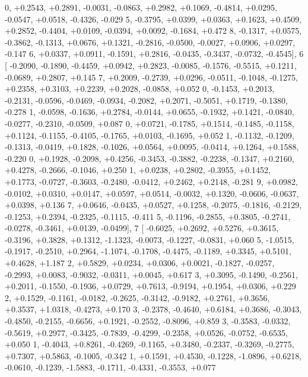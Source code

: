 \begin{DoxyCode}
      0, +0.2543, +0.2891, -0.0031, -0.0863, +0.2982, +0.1069, -0.4814, +0.0295, -0.0547, +0.0518, -0.4326, -0.029
      5, -0.3795, +0.0399, +0.0363, +0.1623, +0.4509, +0.2852, -0.4404, +0.0109, -0.0394, +0.0092, -0.1684, +0.472
      8, -0.1317, +0.0575, -0.3862, -0.1313, +0.0676, +0.1321, -0.2816, -0.0500, -0.0027, +0.0906, +0.0297, -0.147
      6, +0.0337, +0.0911, -0.1591, +0.2816, -0.0435, -0.3437, -0.0732, -0.4545],
6 [ -0.2090, -0.1890, -0.4459, +0.0942, +0.2823, -0.0085, -0.1576, -0.5515, +0.1211, -0.0689, +0.2807, +0.145
      7, +0.2009, -0.2739, +0.0296, -0.0511, -0.1048, -0.1275, +0.2358, +0.3103, +0.2239, +0.2028, -0.0858, +0.052
      0, -0.1453, +0.2013, -0.2131, -0.0596, -0.0469, -0.0934, -0.2082, +0.2071, -0.5051, +0.1719, -0.1380, -0.278
      1, -0.0598, -0.1636, +0.2784, -0.0144, +0.0655, -0.1932, +0.1421, -0.0840, -0.0277, -0.2310, -0.0509, +0.087
      0, +0.0721, -0.1785, +0.1514, -0.1485, -0.1158, +0.1124, -0.1155, -0.4105, -0.1765, +0.0103, -0.1695, +0.052
      1, -0.1132, -0.1209, -0.1313, -0.0419, +0.1828, -0.1026, +0.0564, +0.0095, -0.0414, +0.1264, +0.1588, -0.220
      0, +0.1928, -0.2098, +0.4256, -0.3453, -0.3882, -0.2238, -0.1347, +0.2160, +0.4278, -0.2666, -0.1046, +0.250
      1, +0.0238, +0.2802, -0.3955, +0.1452, +0.1773, -0.0727, -0.3603, -0.2480, -0.0412, +0.2462, +0.2148, -0.281
      9, +0.0982, -0.0102, +0.0310, +0.0147, +0.0597, +0.0514, -0.0032, +0.1320, -0.0606, -0.0637, +0.0398, +0.136
      7, +0.0646, -0.0435, +0.0527, +0.1258, -0.2075, -0.1816, -0.2129, -0.1253, +0.2394, -0.2325, -0.1115, -0.411
      5, -0.1196, -0.2855, +0.3805, -0.2741, -0.0278, -0.3461, +0.0139, -0.0499],
7 [ -0.6025, +0.2692, +0.5276, +0.3615, -0.3196, +0.3828, +0.1312, -1.1323, -0.0073, -0.1227, -0.0831, +0.060
      5, -1.0515, -0.1917, -0.2510, +0.2964, -1.1074, -0.1708, -0.4475, -0.1189, +0.3345, +0.5101, +0.4628, +1.187
      2, +0.5829, +0.0234, +0.0306, +0.0021, -0.1827, -0.0257, -0.2993, +0.0083, -0.9032, -0.0311, +0.0045, +0.617
      3, +0.3095, -0.1490, -0.2561, +0.2011, -0.1550, -0.1936, +0.0729, +0.7613, -0.9194, +0.1954, +0.0306, +0.229
      2, +0.1529, -0.1161, -0.0182, -0.2625, -0.3142, -0.9182, +0.2761, +0.3656, +0.3537, +1.0318, -0.4273, +0.170
      3, -0.2378, -0.4640, +0.6184, +0.3686, -0.3043, -0.4850, -0.2155, -0.6656, +0.1921, -0.2552, -0.8096, +0.859
      3, -0.3583, -0.0332, -0.5619, +0.2977, -0.3425, -0.7839, -0.4299, -0.2358, +0.0526, -0.0752, -0.6535, +0.050
      1, -0.4043, +0.8261, -0.4269, -0.1165, +0.3480, -0.2337, -0.3269, -0.2775, +0.7307, +0.5863, -0.1005, -0.342
      1, +0.1591, +0.4530, -0.1228, -1.0896, +0.6218, -0.0610, -0.1239, -1.5883, -0.1711, -0.4331, -0.3553, +0.077

\end{DoxyCode}
